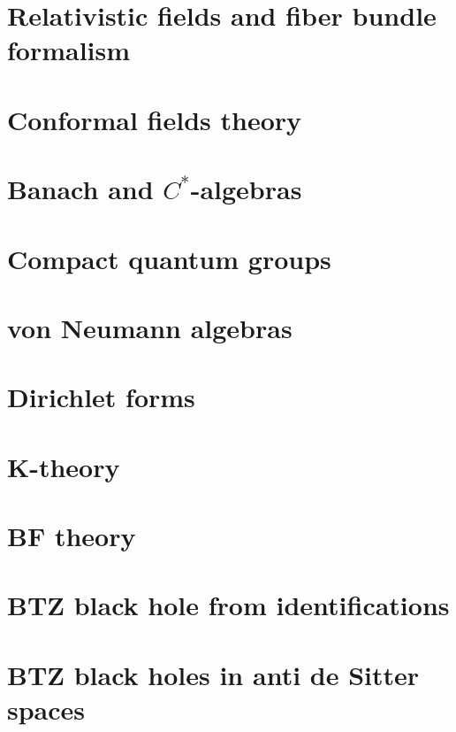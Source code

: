 \documentclass[a4paper,twoside,11pt]{book}
\begin{document}
\chapter{Relativistic fields and fiber bundle formalism}


\chapter{Conformal fields theory}


\chapter{Banach and \texorpdfstring{$C^*$}{C*}-algebras}




\chapter{Compact quantum groups}


\chapter{von Neumann algebras}





\chapter{Dirichlet forms}


\chapter{K-theory}


\chapter{BF theory}


\chapter{BTZ black hole from identifications}




\chapter{BTZ black holes in anti de Sitter spaces}                  \label{ChapBHinAdS}








\end{document}
